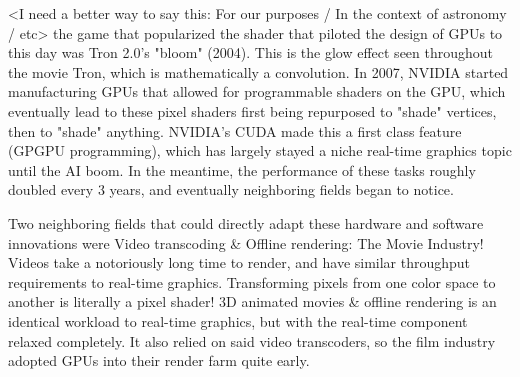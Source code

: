 \documentclass[%
 reprint,
 amsmath,amssymb,
 aps,
showkeys,
]{revtex4-2}
\begin{document}
<I need a better way to say this: For our purposes / In the context of astronomy / etc> the game that popularized the shader that piloted the design of GPUs to this day was Tron 2.0's "bloom" (2004). This is the glow effect seen throughout the movie Tron, which is mathematically a convolution.  In 2007, NVIDIA started manufacturing GPUs that allowed for programmable shaders on the GPU, which eventually lead to these pixel shaders first being repurposed to "shade" vertices, then to "shade" anything. NVIDIA's CUDA made this a first class feature (GPGPU programming), which has largely stayed a niche real-time graphics topic until the AI boom. In the meantime, the performance of these tasks roughly doubled every 3 years, and eventually neighboring fields began to notice.

Two neighboring fields that could directly adapt these hardware and software innovations were Video transcoding & Offline rendering: The Movie Industry! Videos take a notoriously long time to render, and have similar throughput requirements to real-time graphics. Transforming pixels from one color space to another is literally a pixel shader! 3D animated movies & offline rendering is an identical workload to real-time graphics, but with the real-time component relaxed completely. It also relied on said video transcoders, so the film industry adopted GPUs into their render farm quite early. 


\end{document}
